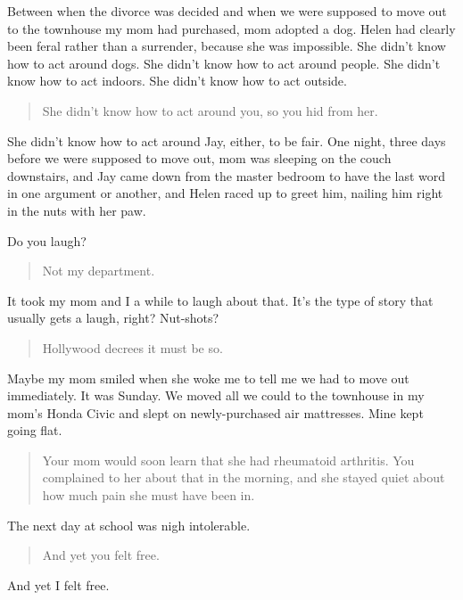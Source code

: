 Between when the divorce was decided and when we were supposed to move out to the townhouse my mom had purchased, mom adopted a dog. Helen had clearly been feral rather than a surrender, because she was impossible. She didn't know how to act around dogs. She didn't know how to act around people. She didn't know how to act indoors. She didn't know how to act outside.

\begin{quote}
She didn't know how to act around you, so you hid from her.
\end{quote}

She didn't know how to act around Jay, either, to be fair. One night, three days before we were supposed to move out, mom was sleeping on the couch downstairs, and Jay came down from the master bedroom to have the last word in one argument or another, and Helen raced up to greet him, nailing him right in the nuts with her paw.

Do you laugh?

\begin{quote}
Not my department.
\end{quote}

It took my mom and I a while to laugh about that. It's the type of story that usually gets a laugh, right? Nut-shots?

\begin{quote}
Hollywood decrees it must be so.
\end{quote}

Maybe my mom smiled when she woke me to tell me we had to move out immediately. It was Sunday. We moved all we could to the townhouse in my mom's Honda Civic and slept on newly-purchased air mattresses. Mine kept going flat.

\begin{quote}
Your mom would soon learn that she had rheumatoid arthritis. You complained to her about that in the morning, and she stayed quiet about how much pain she must have been in.
\end{quote}

The next day at school was nigh intolerable.

\begin{quote}
And yet you felt free.
\end{quote}

And yet I felt free.
